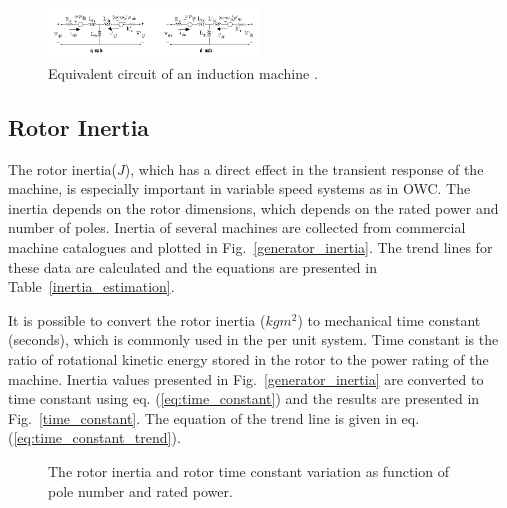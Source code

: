 \documentclass[twocolumn]{article}
\begin{document}
  \begin{figure}
    \centering
    \includegraphics[width=0.5\textwidth]{scig_schematic}
    \caption{Equivalent circuit of an induction machine \cite{matlab2014}.} 
    \label{equivalent_circuit}
  \end{figure}
  
\subsection*{Rotor Inertia}

The rotor inertia($J$), which has a direct effect in the transient response of the machine, is especially important in variable speed systems as in OWC. The inertia depends on the rotor dimensions, which depends on the rated power and number of poles. Inertia of several machines are collected from commercial machine catalogues \cite{Siemens2012} and plotted in Fig.~\ref{generator_inertia}. The trend lines for these data are calculated and the equations are presented in Table~\ref{inertia_estimation}.

It is possible to convert the rotor inertia ($kgm^2$) to mechanical time constant (seconds), which is commonly used in the per unit system.  Time constant is the ratio of rotational kinetic energy stored in the rotor to the power rating of the machine. Inertia values presented in Fig.~\ref{generator_inertia} are converted to time constant using eq. (\ref{eq:time_constant}) and the results are presented in Fig.~\ref{time_constant}. The equation of the trend line is given in eq. (\ref{eq:time_constant_trend}).


\begin{figure}[]
  \centering

    \caption{The rotor inertia and rotor time constant variation as function of pole number and rated power.} 
    \label{inertia_timeconstant}
\end{figure}
\end{document}
